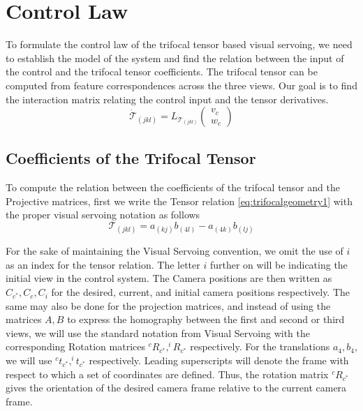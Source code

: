 \section{Control Law}
To formulate the control law of the trifocal tensor based visual servoing, we need to establish the model of the system and find the relation between the input of the control and the trifocal tensor coefficients. The trifocal tensor can be computed from feature correspondences across the three views. Our goal is to find the interaction matrix relating the control input and the tensor derivatives.
\begin{equation}
  \dot{\mathcal{T}}_{(jkl)} = L_{\mathcal{T}_{(jkl)}} \begin{pmatrix} v_c \\ w_c \end{pmatrix}
\end{equation}

\subsection{Coefficients of the Trifocal Tensor}
To compute the relation between the coefficients of the trifocal tensor and the Projective matrices, first we write the Tensor relation \eqref{eq:trifocalgeometry1} with the proper visual servoing notation as follows
\begin{equation}
  \mathcal{T}_{(jkl)} = a_{(kj)}b_{(4l)} - a_{(4k)}b_{(lj)} \label{eq:tensorrelation}
\end{equation}

For the sake of maintaining the Visual Servoing convention, we omit the use of $i$ as an index for the tensor relation. The letter $i$ further on will be indicating the initial view in the control system. The Camera positions are then written as $C_{c^*},C_c,C_i$ for the desired, current, and initial camera positions respectively. The same may also be done for the projection matrices, and instead of using the matrices $A,B$ to express the homography between the first and second or third views, we will use the standard notation from Visual Servoing with the corresponding Rotation matrices $^{c}R_{c^*}, ^{i}R_{c^*}$ respectively. For the translations $a_4, b_4$, we will use $^{c}{t}_{c^*}, ^{i}{t}_{c^*}$ respectively. Leading superscripts will denote the frame with respect to which a set of coordinates are defined. Thus, the rotation matrix $^{c}R_{c^*}$ gives the orientation of the desired camera frame relative to the current camera frame.

